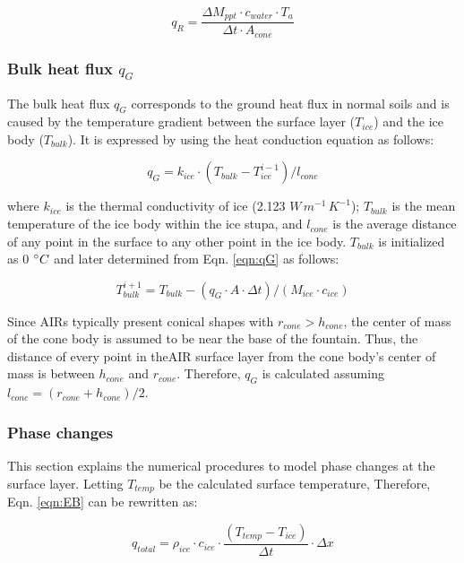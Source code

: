 \begin{equation}
	q_{R} = \frac{ \Delta M_{ppt} \cdot c_{water} \cdot T_a}{\Delta t \cdot A_{cone}}
	\label{eqn:qR}
\end{equation}

\subsubsection{Bulk heat flux \texorpdfstring{$q_{G}$}{Lg}} \label{sec:Bulkflux}

The bulk heat flux $q_{G}$ corresponds to the ground heat flux in normal soils and is caused by the
temperature gradient between the surface layer ($T_{ice}$) and the ice body ($T_{bulk}$). It is expressed by
using the heat conduction equation as follows:

\begin{equation} q_{G} = k_{ice} \cdot (T_{bulk}-T_{ice}^{i-1})/l_{cone} \label{eqn:qG}    \end{equation}

where $k_{ice}$ is the thermal conductivity of ice (2.123 $W\, m^{-1}\,K^{-1}$); $T_{bulk}$ is the mean
temperature of the ice body within the ice stupa, and $l_{cone}$ is the average distance of any point in the
surface to any other point in the ice body. $T_{bulk}$ is initialized as 0 $^{\circ} C$ and later determined from
Eqn. \ref{eqn:qG} as follows:

\begin{equation} T_{bulk}^{i+1} = T_{bulk} - (q_{G} \cdot A \cdot \Delta t)/(M_{ice} \cdot c_{ice}) \end{equation}

Since \ac{AIRs} typically present conical shapes with $r_{cone} > h_{cone}$, the center of mass of the cone body is
assumed to be near the base of the fountain. Thus, the distance of every point in the\ac{AIR} surface layer from the
cone body's center of mass is between $h_{cone}$ and $r_{cone}$. Therefore, $q_{G}$ is calculated assuming
$l_{cone} = (r_{cone} + h_{cone})/2$.

\subsubsection{Phase changes}\label{sec:phase}

This section explains the numerical procedures to model phase changes at the surface layer. Letting
$T_{temp}$ be the calculated surface temperature, Therefore, Eqn. \ref{eqn:EB} can be rewritten as:

$$q_{total} =\rho_{ice} \cdot c_{ice} \cdot \frac{(T_{temp}-T_{ice})}{\Delta t} \cdot \Delta x$$

